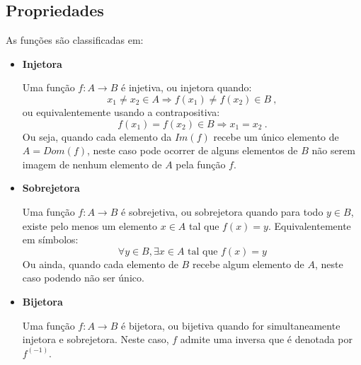 \subsection{Propriedades}
As funções são classificadas em:

\begin{itemize}
 \item \textbf{Injetora}

 Uma função $f: A \rightarrow B$ é injetiva, ou injetora quando:
 \[ x_1 \neq x_2 \in A \Rightarrow f(x_1) \neq f(x_2) \in B \ ,\]
 ou equivalentemente usando a contrapositiva:
 \[f(x_1) = f(x_2) \in B \Rightarrow x_1 = x_2 \ .\]
 Ou seja, quando cada elemento da $Im(f)$ recebe um único elemento de $A= Dom(f)$, neste caso pode ocorrer de alguns elementos de $B$ não serem imagem de nenhum elemento de $A$ pela função $f$.

 \item \textbf{Sobrejetora}

 Uma função $f: A \rightarrow B$ é sobrejetiva, ou sobrejetora quando para todo $y \in B$, existe pelo menos um elemento $x \in A$ tal que $f(x) = y$. Equivalentemente em símbolos:
 $$\forall y \in B, \exists x \in A \text{ tal que } f(x) = y$$
 Ou ainda, quando cada elemento de $B$ recebe algum elemento de $A$, neste caso podendo não ser único.

 \item \textbf{Bijetora}

 Uma função $f: A \rightarrow B$ é bijetora, ou bijetiva quando for simultaneamente injetora e sobrejetora. Neste caso, $f$ admite uma inversa que é denotada por $f^{(-1)}$.

\end{itemize}

